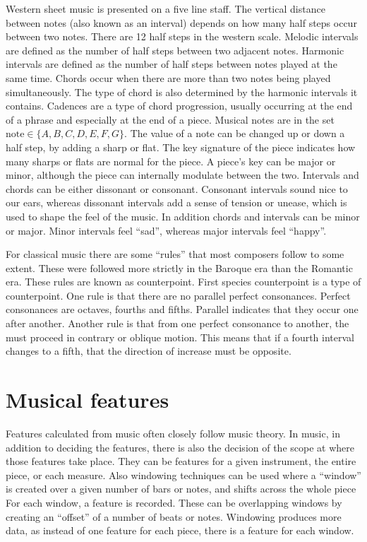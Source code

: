 \documentclass[12pt,twoside]{reedthesis}
\theoremstyle{definition}
\theoremstyle{definition}
\theoremstyle{definition}
\theoremstyle{remark}
\begin{document}
Western sheet music is presented on a five line staff. The vertical
distance between notes (also known as an interval) depends on how many
half steps occur between two notes. There are 12 half steps in the
western scale. Melodic intervals are defined as the number of half steps
between two adjacent notes. Harmonic intervals are defined as the number
of half steps between notes played at the same time. Chords occur when
there are more than two notes being played simultaneously. The type of
chord is also determined by the harmonic intervals it contains. Cadences
are a type of chord progression, usually occurring at the end of a
phrase and especially at the end of a piece. Musical notes are in the
set \(\text{note} \in \{A,B,C,D,E,F,G\}\). The value of a note can be
changed up or down a half step, by adding a sharp or flat. The key
signature of the piece indicates how many sharps or flats are normal for
the piece. A piece's key can be major or minor, although the piece can
internally modulate between the two. Intervals and chords can be either
dissonant or consonant. Consonant intervals sound nice to our ears,
whereas dissonant intervals add a sense of tension or unease, which is
used to shape the feel of the music. In addition chords and intervals
can be minor or major. Minor intervals feel ``sad'', whereas major
intervals feel ``happy''.

For classical music there are some ``rules'' that most composers follow
to some extent. These were followed more strictly in the Baroque era
than the Romantic era. These rules are known as counterpoint. First
species counterpoint is a type of counterpoint. One rule is that there
are no parallel perfect consonances. Perfect consonances are octaves,
fourths and fifths. Parallel indicates that they occur one after
another. Another rule is that from one perfect consonance to another,
the must proceed in contrary or oblique motion. This means that if a
fourth interval changes to a fifth, that the direction of increase must
be opposite.

\section{Musical features}\label{musical-features}

Features calculated from music often closely follow music theory. In
music, in addition to deciding the features, there is also the decision
of the scope at where those features take place. They can be features
for a given instrument, the entire piece, or each measure. Also
windowing techniques can be used where a ``window'' is created over a
given number of bars or notes, and shifts across the whole piece For
each window, a feature is recorded. These can be overlapping windows by
creating an ``offset'' of a number of beats or notes. Windowing produces
more data, as instead of one feature for each piece, there is a feature
for each window.
\end{document}
